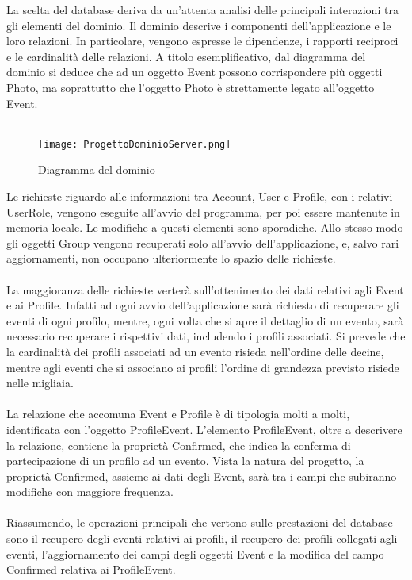 La scelta del database deriva da un’attenta analisi delle principali interazioni tra gli elementi del dominio. 
Il dominio descrive i componenti dell’applicazione e le loro relazioni. 
In particolare, vengono espresse le dipendenze, i rapporti reciproci e le cardinalità delle relazioni. 
A titolo esemplificativo, dal diagramma del dominio si deduce che ad un oggetto Event possono corrispondere più oggetti Photo, 
ma soprattutto che l’oggetto Photo è strettamente legato all’oggetto Event.\\
\\
\begin{figure}[h!]
    \centering
    \texttt{[image: ProgettoDominioServer.png]}
    \caption{ Diagramma del dominio}
\end{figure}
Le richieste riguardo alle informazioni tra Account, User e Profile, con i relativi UserRole, vengono eseguite all’avvio del programma, per poi essere mantenute in memoria locale. 
Le modifiche a questi elementi sono sporadiche.
Allo stesso modo gli oggetti Group vengono recuperati solo all’avvio dell’applicazione, e, salvo rari aggiornamenti, non occupano ulteriormente lo spazio delle richieste.\\
\\
La maggioranza delle richieste verterà sull’ottenimento dei dati relativi agli Event e ai Profile. 
Infatti ad ogni avvio dell’applicazione sarà richiesto di recuperare gli eventi di ogni profilo, mentre, ogni volta che si apre il dettaglio di un evento, 
sarà necessario recuperare i rispettivi dati, includendo i profili associati. 
Si prevede che la cardinalità dei profili associati ad un evento risieda nell’ordine delle decine, 
mentre agli eventi che si associano ai profili l’ordine di grandezza previsto risiede nelle migliaia. \\
\\

La relazione che accomuna Event e Profile è di tipologia molti a molti, identificata con l’oggetto ProfileEvent. 
L’elemento ProfileEvent, oltre a descrivere la relazione, contiene la proprietà Confirmed, che indica la conferma di partecipazione di un profilo ad un evento. 
Vista la natura del progetto, la proprietà Confirmed, assieme ai dati degli Event, sarà tra i campi che subiranno modifiche con maggiore frequenza.\\
\\
Riassumendo, le operazioni principali che vertono sulle prestazioni del database sono il recupero degli eventi relativi ai profili, il recupero dei profili collegati agli eventi, 
l’aggiornamento dei campi degli oggetti Event e la modifica del campo Confirmed relativa ai ProfileEvent.\\
\\

